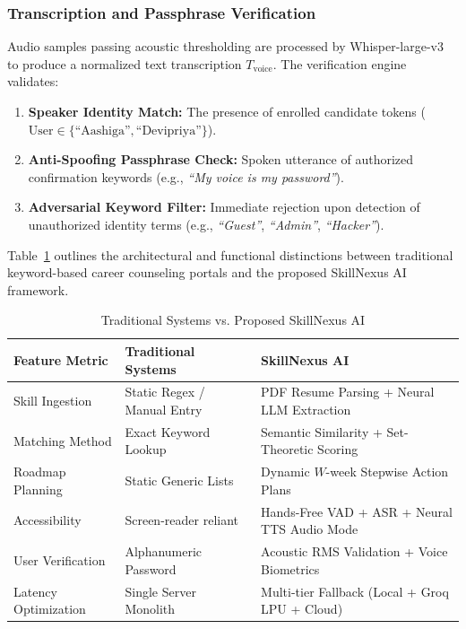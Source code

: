 \documentclass[conference]{IEEEtran}
\begin{document}
\subsubsection{Transcription and Passphrase Verification}
Audio samples passing acoustic thresholding are processed by Whisper-large-v3 to produce a normalized text transcription $T_{\text{voice}}$. The verification engine validates:
\begin{enumerate}
    \item \textbf{Speaker Identity Match:} The presence of enrolled candidate tokens ($\text{User} \in \{\text{``Aashiga''}, \text{``Devipriya''}\}$).
    \item \textbf{Anti-Spoofing Passphrase Check:} Spoken utterance of authorized confirmation keywords (e.g., \textit{``My voice is my password''}).
    \item \textbf{Adversarial Keyword Filter:} Immediate rejection upon detection of unauthorized identity terms (e.g., \textit{``Guest''}, \textit{``Admin''}, \textit{``Hacker''}).
\end{enumerate}

Table~\ref{tab:comparison} outlines the architectural and functional distinctions between traditional keyword-based career counseling portals and the proposed SkillNexus AI framework.

\begin{table}[!htbp]
\caption{Traditional Systems vs. Proposed SkillNexus AI}
\label{tab:comparison}
\centering
\begin{tabular}{p{2.2cm}p{2.8cm}p{2.8cm}}
\toprule
\textbf{Feature Metric} & \textbf{Traditional Systems} & \textbf{SkillNexus AI} \\
\midrule
Skill Ingestion & Static Regex / Manual Entry & PDF Resume Parsing + Neural LLM Extraction \\
Matching Method & Exact Keyword Lookup & Semantic Similarity + Set-Theoretic Scoring \\
Roadmap Planning & Static Generic Lists & Dynamic $W$-week Stepwise Action Plans \\
Accessibility & Screen-reader reliant & Hands-Free VAD + ASR + Neural TTS Audio Mode \\
User Verification & Alphanumeric Password & Acoustic RMS Validation + Voice Biometrics \\
Latency Optimization & Single Server Monolith & Multi-tier Fallback (Local + Groq LPU + Cloud) \\
\bottomrule
\end{tabular}
\end{table}
\end{document}
